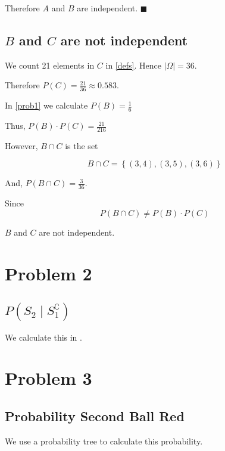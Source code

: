 \documentclass[a4paper,11pt]{article}
\begin{document}
Therefore $A$ and $B$ are independent. $\blacksquare$

\subsection{$B$ and $C$ are not independent}

We count 21 elements in $C$ in \ref{defs}.  Hence 
$\left| \Omega \right| = 36$.

Therefore $P \left( C \right) = \frac{21}{36} \approx 0.583$.

In \ref{prob1} we calculate $P \left( B \right) = \frac{1}{6}$

Thus, $P\left( B \right) \cdot P \left( C \right) = \frac{21}{216}$

However, $B \cap C$ is the set

\begin{equation}
  B \cap C = \left\{ \left( 3,4 \right), \left( 3, 5 \right), 
    \left( 3, 6 \right) \right\}
\end{equation}

And, $P \left( B \cap C \right) = \frac{3}{36} $.

Since
\begin{equation}
  P \left(B \cap C \right) \neq 
  P \left( B \right) \cdot P \left( C \right)
\end{equation}

$B$ and $C$ are not independent.

\section{Problem 2}

\subsection{$ P\left( S_{2} \mid S_{1}^{\complement} \right) $}

We calculate this in \cite{hancockReading3}.

\section{Problem 3}

\subsection{Probability Second Ball Red} \label{treeSection}

We use a probability tree to calculate this probability.
\end{document}
